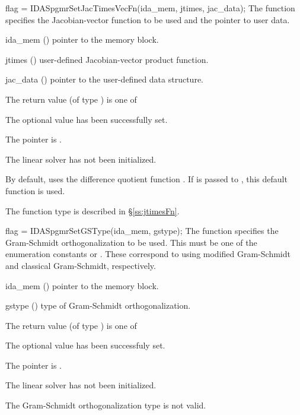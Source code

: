 {
  flag = IDASpgmrSetJacTimesVecFn(ida\_mem, jtimes, jac\_data);
}
{
  The function  specifies the Jacobian-vector 
  function to be used and the pointer to user data.
}
{
  \begin{args}
  \item[ida\_mem] ()
    pointer to the {\ida} memory block.
  \item[jtimes] ()
    user-defined Jacobian-vector product function.
  \item[jac\_data] ()
     pointer to the user-defined data structure.
  \end{args}
}
{
  The return value  (of type ) is one of
  \begin{args}
  \item[\Id{IDASPGMR\_SUCCESS}] 
    The optional value has been successfully set.
  \item[\Id{IDASPGMR\_MEM\_NULL}]
    The  pointer is .
  \item[\Id{IDASPGMR\_LMEM\_NULL}]
    The {\idaspgmr} linear solver has not been initialized.
  \end{args}
}
{
  By default, {\idaspgmr} uses the difference quotient function .
  If  is passed to , this default function is used.

  The function type  is described in \S\ref{ss:jtimesFn}.
}
{
  flag = IDASpgmrSetGSType(ida\_mem, gstype);
}
{
  The function  specifies the 
  Gram-Schmidt orthogonalization to be used. 
  This must be one of the enumeration constants 
  or . These correspond to using modified Gram-Schmidt 
  and classical Gram-Schmidt, respectively. 
}
{
  \begin{args}
  \item[ida\_mem] ()
    pointer to the {\ida} memory block.
  \item[gstype] ()
    type of Gram-Schmidt orthogonalization.
  \end{args}
}
{
  The return value  (of type ) is one of
  \begin{args}
  \item[\Id{IDASPGMR\_SUCCESS}] 
    The optional value has been successfuly set.
  \item[\Id{IDASPGMR\_MEM\_NULL}]
    The  pointer is .
  \item[\Id{IDASPGMR\_LMEM\_NULL}]
    The {\idaspgmr} linear solver has not been initialized.
  \item[\Id{IDASPGMR\_ILL\_INPUT}]
    The Gram-Schmidt orthogonalization type  is not valid.
  \end{args}
}
